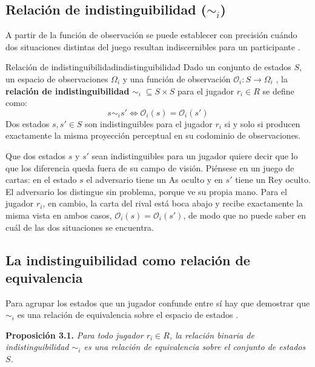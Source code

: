 \subsection{Relación de indistinguibilidad (\texorpdfstring{$\sim_i$}{sim i})}

A partir de la función de observación se puede establecer con precisión cuándo dos situaciones distintas del juego resultan indiscernibles para un participante \cite{OsborneRubinstein1994}.

\begin{definicion}{Relación de indistinguibilidad}{indistinguibilidad}
Dado un conjunto de estados $S$, un espacio de observaciones $\Omega_i$ y una función de observación $\mathcal{O}_i : S \to \Omega_i$ \cite{Kuhn1953, OsborneRubinstein1994, Thielscher2010GDLII}, la \textbf{relación de indistinguibilidad} $\sim_i \; \subseteq S \times S$ para el jugador $r_i \in R$ se define como:
\begin{equation}
    s \sim_i s' \iff \mathcal{O}_i(s) = \mathcal{O}_i(s')
    \label{eq:indistinguibilidad}
\end{equation}
Dos estados $s, s' \in S$ son indistinguibles para el jugador $r_i$ si y solo si producen exactamente la misma proyección perceptual en su codominio de observaciones.
\end{definicion}

Que dos estados $s$ y $s'$ sean indistinguibles para un jugador quiere decir que lo que los diferencia queda fuera de su campo de visión. Piénsese en un juego de cartas: en el estado $s$ el adversario tiene un As oculto y en $s'$ tiene un Rey oculto. El adversario los distingue sin problema, porque ve su propia mano. Para el jugador $r_i$, en cambio, la carta del rival está boca abajo y recibe exactamente la misma vista en ambos casos, $\mathcal{O}_i(s) = \mathcal{O}_i(s')$, de modo que no puede saber en cuál de las dos situaciones se encuentra.

\subsection{La indistinguibilidad como relación de equivalencia}

Para agrupar los estados que un jugador confunde entre sí hay que demostrar que $\sim_i$ es una relación de equivalencia sobre el espacio de estados \cite{OsborneRubinstein1994}.

\vspace{0.5em}
\noindent\textbf{Proposición 3.1.} \textit{Para todo jugador $r_i \in R$, la relación binaria de indistinguibilidad $\sim_i$ es una relación de equivalencia sobre el conjunto de estados $S$.}

